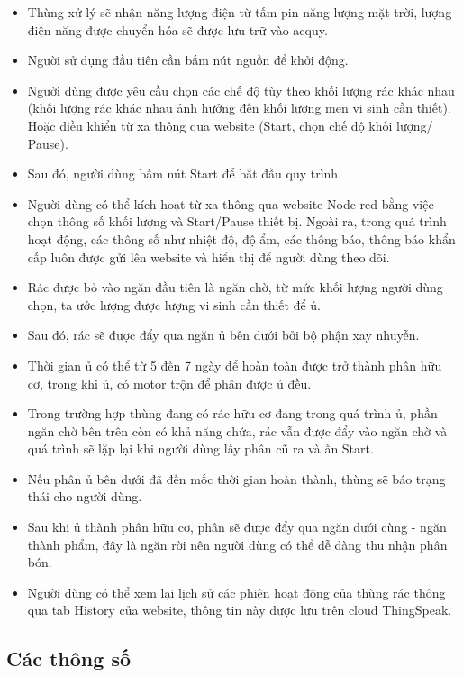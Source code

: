 \documentclass[12pt, a4paper]{article}
\begin{document}
\begin{itemize}
    \item Thùng xử lý sẽ nhận năng lượng điện từ tấm pin năng lượng mặt trời, lượng điện năng được chuyển hóa sẽ được lưu trữ vào acquy.
    \item Người sử dụng đầu tiên cần bấm nút nguồn để khởi động.
    \item Người dùng được yêu cầu chọn các chế độ tùy theo khối lượng rác khác nhau (khối lượng rác khác nhau ảnh hưởng đến khối lượng men vi sinh cần thiết). Hoặc điều khiển từ xa thông qua website (Start, chọn chế độ khối lượng/ Pause).
    \item Sau đó, người dùng bấm nút Start để bắt đầu quy trình.
    \item Người dùng có thể kích hoạt từ xa thông qua website Node-red bằng việc chọn thông số khối lượng và Start/Pause thiết bị. Ngoài ra, trong quá trình hoạt động, các thông số như nhiệt độ, độ ẩm, các thông báo, thông báo khẩn cấp luôn được gửi lên website và hiển thị để người dùng theo dõi.
    \item Rác được bỏ vào ngăn đầu tiên là ngăn chờ, từ mức khối lượng người dùng chọn, ta ước lượng được lượng vi sinh cần thiết để ủ.
    \item Sau đó, rác sẽ được đẩy qua ngăn ủ bên dưới bởi bộ phận xay nhuyễn.
    \item Thời gian ủ có thể từ 5 đến 7 ngày để hoàn toàn được trở thành phân hữu cơ, trong khi ủ, có motor trộn để phân được ủ đều.
    \item Trong trường hợp thùng đang có rác hữu cơ đang trong quá trình ủ, phần ngăn chờ bên trên còn có khả năng chứa, rác vẫn được đẩy vào ngăn chờ và quá trình sẽ lặp lại khi người dùng lấy phân cũ ra và ấn Start.
    \item Nếu phân ủ bên dưới đã đến mốc thời gian hoàn thành, thùng sẽ báo trạng thái cho người dùng.
    \item Sau khi ủ thành phân hữu cơ, phân sẽ được đẩy qua ngăn dưới cùng - ngăn thành phẩm, đây là ngăn rời nên người dùng có thể dễ dàng thu nhận phân bón.
    \item Người dùng có thể xem lại lịch sử các phiên hoạt động của thùng rác thông qua tab History của website, thông tin này được lưu trên cloud ThingSpeak.
\end{itemize}

\subsection{Các thông số}
\end{document}
